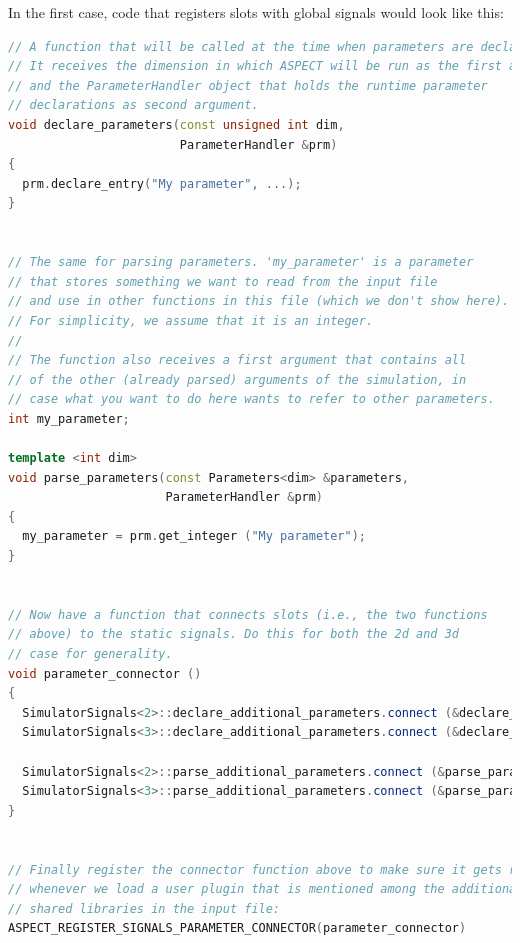 \documentclass{article}
\begin{document}
In the first case, code that registers slots with global signals would look like
this:
\begin{lstlisting}[frame=single,language=C++]
// A function that will be called at the time when parameters are declared.
// It receives the dimension in which ASPECT will be run as the first argument,
// and the ParameterHandler object that holds the runtime parameter
// declarations as second argument.
void declare_parameters(const unsigned int dim,
                        ParameterHandler &prm)
{
  prm.declare_entry("My parameter", ...);
}


// The same for parsing parameters. 'my_parameter' is a parameter
// that stores something we want to read from the input file
// and use in other functions in this file (which we don't show here).
// For simplicity, we assume that it is an integer.
//
// The function also receives a first argument that contains all
// of the other (already parsed) arguments of the simulation, in
// case what you want to do here wants to refer to other parameters.
int my_parameter;

template <int dim>
void parse_parameters(const Parameters<dim> &parameters,
                      ParameterHandler &prm)
{
  my_parameter = prm.get_integer ("My parameter");
}


// Now have a function that connects slots (i.e., the two functions
// above) to the static signals. Do this for both the 2d and 3d
// case for generality.
void parameter_connector ()
{
  SimulatorSignals<2>::declare_additional_parameters.connect (&declare_parameters);
  SimulatorSignals<3>::declare_additional_parameters.connect (&declare_parameters);

  SimulatorSignals<2>::parse_additional_parameters.connect (&parse_parameters<2>);
  SimulatorSignals<3>::parse_additional_parameters.connect (&parse_parameters<3>);
}


// Finally register the connector function above to make sure it gets run
// whenever we load a user plugin that is mentioned among the additional
// shared libraries in the input file:
ASPECT_REGISTER_SIGNALS_PARAMETER_CONNECTOR(parameter_connector)
 \end{lstlisting}
\end{document}
